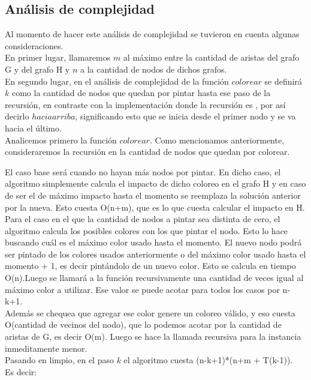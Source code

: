 \subsection{Análisis de complejidad}

\indent Al momento de hacer este análisis de complejidad se tuvieron en cuenta algunas consideraciones.\\
\indent En primer lugar, llamaremos $m$ al máximo entre la cantidad de aristas del grafo G y del grafo H  y $n$ a la cantidad de nodos de dichos grafos.\\
\indent En segundo lugar, en el análisis de complejidad de la función $colorear$ se definirá $k$ como la cantidad de nodos que quedan por pintar hasta ese paso de la recursión, en contraste con la implementación donde la recursión es , por así decirlo $hacia arriba$, significando esto que se inicia desde el primer nodo y se va hacia el último.\\

\indent Analicemos primero la función $colorear$. Como mencionamos anteriormente, consideraremos la recursión en la cantidad de nodos que quedan por colorear.

\indent El caso base será cuando no hayan más nodos por pintar. En dicho caso, el algoritmo simplemente calcula el impacto de dicho coloreo en el grafo H y en caso de ser el de máximo impacto hasta el momento se reemplaza la solución anterior por la nueva. Esto cuesta O(n+m), que es lo que cuesta calcular el impacto en H.\\
\indent Para el caso en el que la cantidad de nodos a pintar sea distinta de cero, el algoritmo calcula los posibles colores con los que pintar el nodo. Esto lo hace buscando cuál es el máximo color usado hasta el momento. El nuevo nodo podrá ser pintado de los colores usados anteriormente o del máximo color usado hasta el momento + 1, es decir pintándolo de un nuevo color. Esto se calcula en tiempo O(n).Luego se llamará a la función recursivamente una cantidad de veces igual al máximo color a utilizar. Ese valor se puede acotar para todos los casos por n-k+1.\\
\indent Además se chequea que agregar ese color genere un coloreo válido, y eso cuesta O(cantidad de vecinos del nodo), que lo podemos acotar por la cantidad de aristas de G, es decir O(m). Luego se hace la llamada recursiva para la instancia inmeditamente menor.\\
\indent Pasando en limpio, en el paso $k$ el algoritmo cuesta (n-k+1)*(n+m + T(k-1)).\\
\indent Es decir:\\

